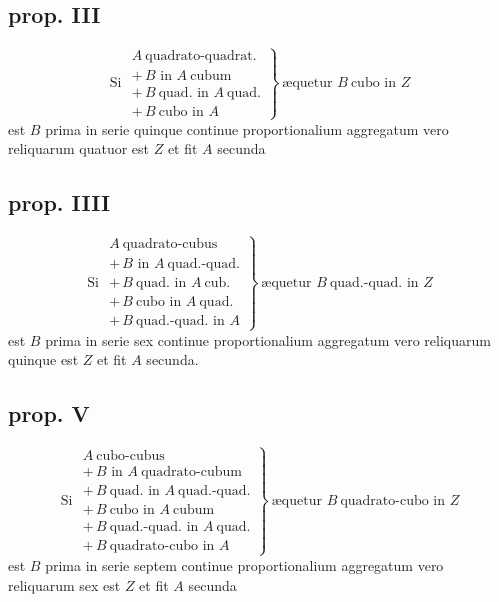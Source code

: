 \documentclass[11pt,a4paper]{article}
\begin{document}
\subsection*{prop. III}

\[ \text{Si } \left.\begin{array}{l} A\ \text{quadrato-quadrat.} \\ +\,B \text{ in } A\ \text{cubum} \\ +\,B\ \text{quad. in } A\ \text{quad.} \\ +\,B\ \text{cubo in } A \end{array}\right\}\ \text{æquetur } B\ \text{cubo in } Z \]
est $B$ prima in serie quinque continue proportionalium aggregatum vero reliquarum quatuor est $Z$ et fit $A$ secunda

\subsection*{prop. IIII}

\[ \text{Si } \left.\begin{array}{l} A\ \text{quadrato-cubus} \\ +\,B \text{ in } A\ \text{quad.-quad.} \\ +\,B\ \text{quad. in } A\ \text{cub.} \\ +\,B\ \text{cubo in } A\ \text{quad.} \\ +\,B\ \text{quad.-quad. in } A \end{array}\right\}\ \text{æquetur } B\ \text{quad.-quad. in } Z \]
est $B$ prima in serie sex continue proportionalium aggregatum vero reliquarum quinque est $Z$ et fit $A$ secunda.


\subsection*{prop. V}

\[ \text{Si } \left.\begin{array}{l} A\ \text{cubo-cubus} \\ +\,B \text{ in } A\ \text{quadrato-cubum} \\ +\,B\ \text{quad. in } A\ \text{quad.-quad.} \\ +\,B\ \text{cubo in } A\ \text{cubum} \\ +\,B\ \text{quad.-quad. in } A\ \text{quad.} \\ +\,B\ \text{quadrato-cubo in } A \end{array}\right\}\ \text{æquetur } B\ \text{quadrato-cubo in } Z \]
est $B$ prima in serie septem continue proportionalium aggregatum vero reliquarum sex est $Z$ et fit $A$ secunda
\end{document}
